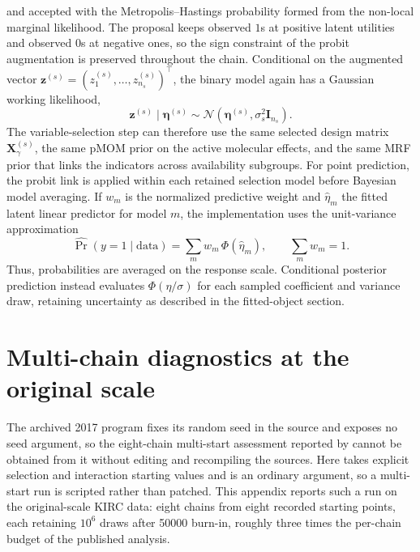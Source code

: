 \documentclass[article]{jss}
\begin{document}
%
and accepted with the Metropolis--Hastings probability formed from the non-local
marginal likelihood.  The proposal keeps observed $1$s at positive latent
utilities and observed $0$s at negative ones, so the sign constraint of the
probit augmentation is preserved throughout the chain.
%
Conditional on the augmented vector
$\bm{z}^{(s)}=(z_1^{(s)},\dots,z_{n_s}^{(s)})^\top$, the binary model again has
a Gaussian working likelihood,
%
\begin{equation}\label{eq:binary-working}
  \bm{z}^{(s)}\mid\bm{\eta}^{(s)}
  \sim \mathcal{N}\!\left(\bm{\eta}^{(s)},\sigma_s^2\bm{I}_{n_s}\right).
\end{equation}
%
The variable-selection step can therefore use the same selected design matrix
$\bm{X}_{\gamma}^{(s)}$, the same pMOM prior on the active molecular effects,
and the same MRF prior that links the indicators across availability subgroups.
For point prediction, the probit link is applied within each retained selection
model before Bayesian model averaging. If $w_m$ is the normalized predictive
weight and $\hat{\eta}_m$ the fitted latent linear predictor for model $m$, the
implementation uses the unit-variance approximation
\[
  \widehat{\Pr}(y=1\mid\text{data})
  = \sum_m w_m\,\Phi(\hat{\eta}_m), \qquad \sum_m w_m=1.
\]
Thus, probabilities are averaged on the response scale. Conditional posterior
prediction instead evaluates $\Phi(\eta/\sigma)$ for each sampled coefficient
and variance draw, retaining uncertainty as described in the fitted-object
section.

\clearpage
\section{Multi-chain diagnostics at the original scale}
\label{sec:appendix-chains}
\setcounter{table}{0}
\setcounter{figure}{0}

The archived 2017 program fixes its random seed in the source and exposes no
seed argument, so the eight-chain multi-start assessment reported by
\citet{chekouo2017} cannot be obtained from it without editing and recompiling
the  sources. Here  takes explicit selection and
interaction starting values and  is an ordinary argument, so a
multi-start run is scripted rather than patched. This appendix reports such a
run on the original-scale KIRC data: eight chains from eight recorded starting
points, each retaining $10^{6}$ draws after 50000 burn-in, roughly three times
the per-chain budget of the published analysis.
\end{document}
